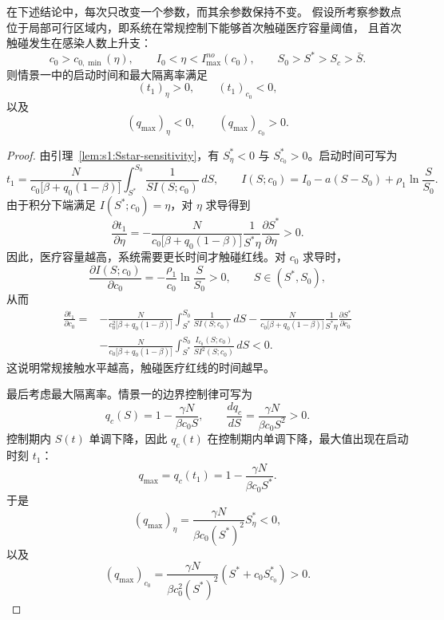 \documentclass[lang=cn,a4paper,newtx]{elegantpaper}
\numberwithin{equation}{section}
\theoremstyle{plain}
\begin{document}
\begin{proposition}[启动时间与最大隔离率的参数敏感性]
\label{prop:s1:sensitivity}
在下述结论中，每次只改变一个参数，而其余参数保持不变。
假设所考察参数点位于局部可行区域内，即系统在常规控制下能够首次触碰医疗容量阈值，
且首次触碰发生在感染人数上升支：
\[
c_0>c_{0,\min}(\eta),
\qquad
I_0<\eta<I_{\max}^{no}(c_0),
\qquad
S_0>S^*>S_c>\bar S.
\]
则情景一中的启动时间和最大隔离率满足
\[
(t_1)_\eta>0,
\qquad
(t_1)_{c_0}<0,
\]
以及
\[
(q_{\max})_\eta<0,
\qquad
(q_{\max})_{c_0}>0.
\]
\end{proposition}

\begin{proof}
由引理~\ref{lem:s1:Sstar-sensitivity}，有
$S^*_\eta<0$ 与 $S^*_{c_0}>0$。启动时间可写为
\begin{equation}
t_1
=
\frac{N}{c_0\bigl[\beta+q_0(1-\beta)\bigr]}
\int_{S^*}^{S_0}
\frac{1}{S I(S;c_0)}\,dS,
\qquad
I(S;c_0)
=
I_0-a(S-S_0)+\rho_1\ln\frac{S}{S_0}.
\end{equation}
由于积分下端满足 $I(S^*;c_0)=\eta$，对 $\eta$ 求导得到
\begin{equation}
\frac{\partial t_1}{\partial \eta}
=
-\frac{N}{c_0\bigl[\beta+q_0(1-\beta)\bigr]}
\frac{1}{S^*\eta}
\frac{\partial S^*}{\partial \eta}>0.
\end{equation}
因此，医疗容量越高，系统需要更长时间才触碰红线。对 $c_0$ 求导时，
\[
\frac{\partial I(S;c_0)}{\partial c_0}
=
-\frac{\rho_1}{c_0}\ln\frac{S}{S_0}>0,
\qquad S\in(S^*,S_0),
\]
从而
\begin{align}
\frac{\partial t_1}{\partial c_0}
=&
-\frac{N}{c_0^2\bigl[\beta+q_0(1-\beta)\bigr]}
\int_{S^*}^{S_0}\frac{1}{S I(S;c_0)}\,dS
-\frac{N}{c_0\bigl[\beta+q_0(1-\beta)\bigr]}
\frac{1}{S^*\eta}
\frac{\partial S^*}{\partial c_0} \nonumber\\
&-\frac{N}{c_0\bigl[\beta+q_0(1-\beta)\bigr]}
\int_{S^*}^{S_0}
\frac{I_{c_0}(S;c_0)}{S I^2(S;c_0)}\,dS
<0.
\end{align}
这说明常规接触水平越高，触碰医疗红线的时间越早。

最后考虑最大隔离率。情景一的边界控制律可写为
\[
q_c(S)=1-\frac{\gamma N}{\beta c_0S},
\qquad
\frac{dq_c}{dS}
=
\frac{\gamma N}{\beta c_0S^2}>0.
\]
控制期内 $S(t)$ 单调下降，因此 $q_c(t)$ 在控制期内单调下降，最大值出现在启动时刻 $t_1$：
\[
q_{\max}
=
q_c(t_1)
=
1-\frac{\gamma N}{\beta c_0S^*}.
\]
于是
\[
(q_{\max})_\eta
=
\frac{\gamma N}{\beta c_0(S^*)^2}S^*_\eta<0,
\]
以及
\[
(q_{\max})_{c_0}
=
\frac{\gamma N}{\beta c_0^2(S^*)^2}
\left(S^*+c_0S^*_{c_0}\right)>0.
\]
\end{proof}
\end{document}
